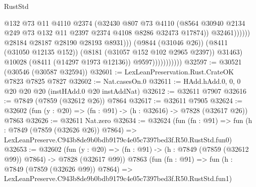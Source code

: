 \begin{lexlean}{RustStd}
\begin{coremodule}
                                              @132
                                              @73
                                              @11
                                              @4110
                                              @2374
                                              (@32430
                                                @807
                                                @73
                                                @4110
                                                (@8564
                                                  @30940
                                                  @2134
                                                  @249
                                                  @73
                                                  @132
                                                  @11
                                                  @2397
                                                  @2374
                                                  @4108
                                                  @8286
                                                  @32473
                                                  @17874))
                                              @32461))))))
                                  @28184
                                  @28187
                                  @28190
                                  @28193
                                  @8931)))
                            (@9844 (@31046 @26))
                            (@8411 (@31050 @12135 @152))
                            (@8181 (@31057 @152 @102 @2965 @2397))
                            @31463)
                          @10028
                          (@8411 (@14297 @1973 @12136))
                          @9597)))))))))))
@32597 := @30521 (@30546 (@30587 @32594))
@32601 := LexLeanPreservation.Rust.CrateOK @7823 @7825 @7827
@32602 := Nat.casesOn.{0}
@32611 := HAdd.hAdd.{0, 0, 0} @20 @20 @20 (instHAdd.{0} @20 instAddNat)
@32612 := @32611 @7907
@32616 := @7849 (@7859 (@32612 @26)) @7864
@32617 := @32611 @7905
@32624 := @32602 (fun (y : @20) => (fn : @91) -> (h : @32616) -> @7828 (@32617 @26)) @7863
@32626 := @32611 Nat.zero
@32634 := @32624
    (fun (fn : @91) =>
    fun (h : @7849 (@7859 (@32626 @26)) @7864) =>
    LexLeanPreserve.C943b8de9b0bdb9179c4e05c7397bed3f.R50.RustStd.fun0)
@32653 := @32602
    (fun (y : @20) => (fn : @91) -> (h : @7849 (@7859 (@32612 @99)) @7864) -> @7828 (@32617 @99))
    @7863
    (fun (fn : @91) =>
    fun (h : @7849 (@7859 (@32626 @99)) @7864) =>
    LexLeanPreserve.C943b8de9b0bdb9179c4e05c7397bed3f.R50.RustStd.fun1)

\end{coremodule}
\end{lexlean}
